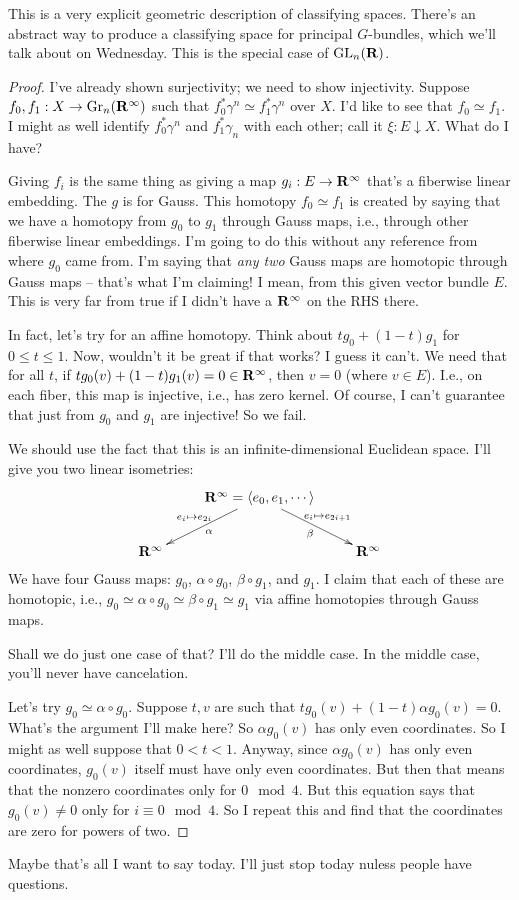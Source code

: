This is a very explicit geometric description of classifying spaces. There's an abstract way to produce a classifying space for principal $G$-bundles, which we'll talk about on Wednesday. This is the special case of $\mathrm{GL}_n(\mathbf R)$.
\begin{proof}
    I've already shown surjectivity; we need to show injectivity. Suppose $f_0,f_1:X\to \mathrm{Gr}_n(\mathbf R^\infty)$ such that $f_0^\ast\gamma^n\simeq f_1^\ast\gamma^n$ over $X$.
    I'd like to see that $f_0\simeq f_1$.
    I might as well identify $f_0^\ast\gamma^n$ and $f_1^\ast\gamma_n$ with each other; call it $\xi:E\downarrow X$. What do I have?

    Giving $f_i$ is the same thing as giving a map $g_i:E\to\mathbf R^\infty$ that's a fiberwise linear embedding.
    The $g$ is for Gauss.
    This homotopy $f_0\simeq f_1$ is created by saying that we have a homotopy from $g_0$ to $g_1$ through Gauss maps, i.e., through other fiberwise linear embeddings.
    I'm going to do this without any reference from where $g_0$ came from. I'm saying that \emph{any two} Gauss maps are homotopic through Gauss maps -- that's what I'm claiming! I mean, from this given vector bundle $E$.
    This is very far from true if I didn't have a $\mathbf R^\infty$ on the RHS there.

    In fact, let's try for an affine homotopy. Think about $tg_0 + (1-t)g_1$ for $0\leq t\leq 1$. Now, wouldn't it be great if that works? I guess it can't.
    We need that for all $t$, if $tg_0(v) + (1-t)g_1(v) = 0\in\mathbf R^\infty$, then $v=0$ (where $v\in E$). I.e., on each fiber, this map is injective, i.e., has zero kernel. Of course, I can't guarantee that just from $g_0$ and $g_1$ are injective!
    So we fail.

    We should use the fact that this is an infinite-dimensional Euclidean space. I'll give you two linear isometries:
    \begin{equation*}
	\xymatrix{
	    & \RR^\infty = \langle e_0,e_1,\cdots\rangle\ar[dl]^\alpha_{e_i\mapsto e_{2i}}\ar[dr]_\beta^{e_i\mapsto e_{2i+1}} & \\
	    \RR^\infty & & \RR^\infty
	    }
    \end{equation*}
    We have four Gauss maps: $g_0$, $\alpha\circ g_0$, $\beta\circ g_1$, and $g_1$.
    I claim that each of these are homotopic, i.e., $g_0\simeq \alpha \circ g_0\simeq \beta\circ g_1\simeq g_1$ via affine homotopies through Gauss maps.

    Shall we do just one case of that? I'll do the middle case. In the middle case, you'll never have cancelation.

    Let's try $g_0\simeq\alpha\circ g_0$. Suppose $t,v$ are such that $tg_0(v) + (1-t)\alpha g_0(v) = 0$. What's the argument I'll make here? So $\alpha g_0(v)$ has only even coordinates. So I might as well suppose that $0<t<1$. Anyway, since $\alpha g_0(v)$ has only even coordinates, $g_0(v)$ itself must have only even coordinates. But then that means that the nonzero coordinates only for $0\mod 4$. But this equation says that $g_0(v)\neq 0$ only for $i\equiv 0\mod 4$. So I repeat this and find that the coordinates are zero for powers of two.
\end{proof}
Maybe that's all I want to say today. I'll just stop today nuless people have questions.
